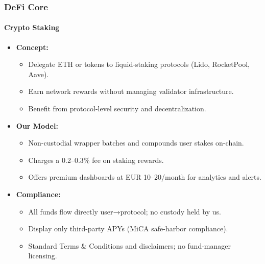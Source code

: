 \documentclass[13pt]{extarticle}
\begin{document}
\subsubsection{DeFi Core}

\paragraph{Crypto Staking}
\begin{itemize}[left=1em]
  \item \textbf{Concept:}
    \begin{itemize}[left=1.2em]
      \item Delegate ETH or tokens to liquid-staking protocols (Lido, RocketPool, Aave).
      \item Earn network rewards without managing validator infrastructure.
      \item Benefit from protocol-level security and decentralization.
    \end{itemize}
  \item \textbf{Our Model:}
    \begin{itemize}[left=1.2em]
      \item Non-custodial wrapper batches and compounds user stakes on-chain.
      \item Charges a 0.2–0.3\% fee on staking rewards.
      \item Offers premium dashboards at EUR 10–20/month for analytics and alerts.
    \end{itemize}
  \item \textbf{Compliance:}
    \begin{itemize}[left=1.2em]
      \item All funds flow directly user→protocol; no custody held by us.
      \item Display only third-party APYs (MiCA safe-harbor compliance).
      \item Standard Terms \& Conditions and disclaimers; no fund-manager licensing.
    \end{itemize}
\end{itemize}
\end{document}
